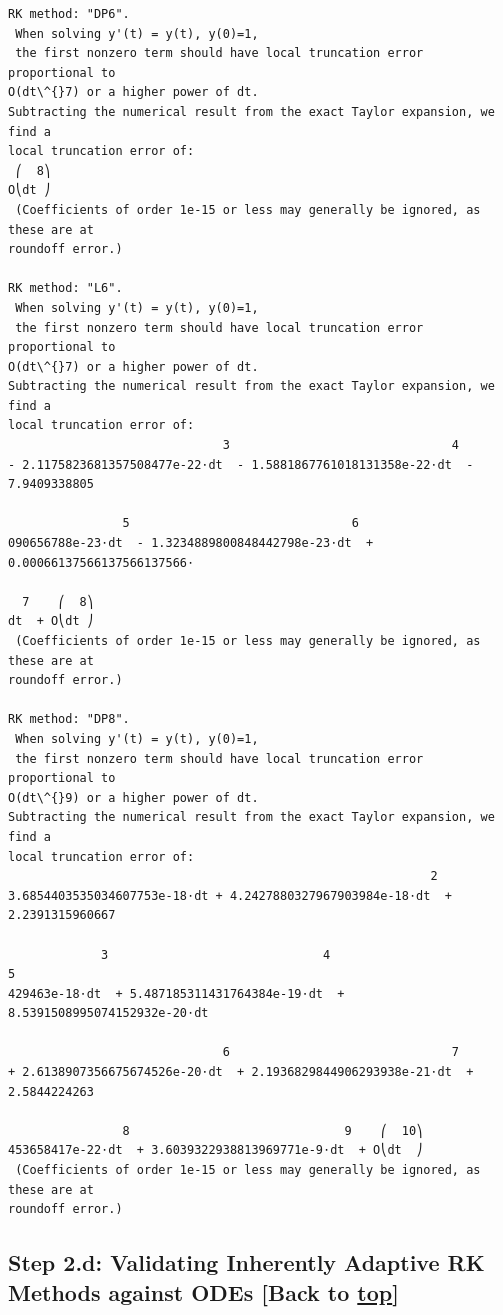 \documentclass[landscape,letterpaper,10pt,english]{article}
\begin{document}
\begin{Verbatim}[commandchars=\\\{\}]
RK method: "DP6".
 When solving y'(t) = y(t), y(0)=1,
 the first nonzero term should have local truncation error proportional to
O(dt\^{}7) or a higher power of dt.
Subtracting the numerical result from the exact Taylor expansion, we find a
local truncation error of:
 ⎛  8⎞
O⎝dt ⎠
 (Coefficients of order 1e-15 or less may generally be ignored, as these are at
roundoff error.)

RK method: "L6".
 When solving y'(t) = y(t), y(0)=1,
 the first nonzero term should have local truncation error proportional to
O(dt\^{}7) or a higher power of dt.
Subtracting the numerical result from the exact Taylor expansion, we find a
local truncation error of:
                              3                               4
- 2.1175823681357508477e-22⋅dt  - 1.5881867761018131358e-22⋅dt  - 7.9409338805

                5                               6
090656788e-23⋅dt  - 1.3234889800848442798e-23⋅dt  + 0.00066137566137566137566⋅

  7    ⎛  8⎞
dt  + O⎝dt ⎠
 (Coefficients of order 1e-15 or less may generally be ignored, as these are at
roundoff error.)

RK method: "DP8".
 When solving y'(t) = y(t), y(0)=1,
 the first nonzero term should have local truncation error proportional to
O(dt\^{}9) or a higher power of dt.
Subtracting the numerical result from the exact Taylor expansion, we find a
local truncation error of:
                                                           2
3.6854403535034607753e-18⋅dt + 4.2427880327967903984e-18⋅dt  + 2.2391315960667

             3                              4                               5
429463e-18⋅dt  + 5.487185311431764384e-19⋅dt  + 8.5391508995074152932e-20⋅dt

                              6                               7
+ 2.6138907356675674526e-20⋅dt  + 2.1936829844906293938e-21⋅dt  + 2.5844224263

                8                              9    ⎛  10⎞
453658417e-22⋅dt  + 3.6039322938813969771e-9⋅dt  + O⎝dt  ⎠
 (Coefficients of order 1e-15 or less may generally be ignored, as these are at
roundoff error.)

    \end{Verbatim}

    \hypertarget{step-2.d-validating-inherently-adaptive-rk-methods-against-odes-back-to-top}{%
\subsection{\texorpdfstring{Step 2.d: Validating Inherently Adaptive RK
Methods against ODEs {[}Back to
\hyperref[toc]{top}{]}}{Step 2.d: Validating Inherently Adaptive RK Methods against ODEs {[}Back to {]}}}\label{step-2.d-validating-inherently-adaptive-rk-methods-against-odes-back-to-top}}
\end{document}
